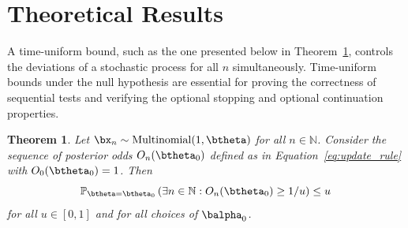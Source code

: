 \documentclass[11pt]{article}
\newtheorem{thm}{Theorem}[section]
\begin{document}
\section{Theoretical Results}
\label{sec:theory}
A time-uniform bound, such as the one presented below in Theorem~\ref{thm:type_1_error}, controls the deviations of a stochastic process for all $n$ simultaneously.
Time-uniform bounds under the null hypothesis are essential for proving the correctness of sequential tests and verifying the optional stopping and optional continuation properties.
\begin{thm}  
  \label{thm:type_1_error}
  Let $\bx_n\sim \mathrm{Multinomial}(1,\btheta)$ for all $n \in \mathbb{N}$.
Consider the sequence of posterior odds $O_n(\btheta_0)$ defined as in Equation~\ref{eq:update_rule} with $O_0(\btheta_0)=1$. Then
\begin{equation}
  \label{eq:type_1_error}
  \mathbb{P}_{\btheta = \btheta_0}\left( \exists n \in \mathbb{N}: O_n(\btheta_0) \geq 1/u \right) \leq u
\end{equation}
for all $u \in [0,1]$ and for all choices of $\balpha_0$.
\end{thm}
\end{document}
